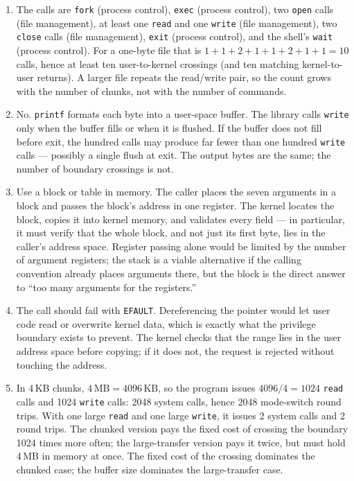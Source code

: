 \documentclass[11pt]{article}
\begin{document}
\begingroup\small
\begin{enumerate}
  \item The calls are \texttt{fork} (process control), \texttt{exec} (process
        control), two \texttt{open} calls (file management), at least one
        \texttt{read} and one \texttt{write} (file management), two
        \texttt{close} calls (file management), \texttt{exit} (process
        control), and the shell's \texttt{wait} (process control). For a
        one-byte file that is $1+1+2+1+1+2+1+1 = 10$ calls, hence at least ten
        user-to-kernel crossings (and ten matching kernel-to-user returns). A
        larger file repeats the read/write pair, so the count grows with the
        number of chunks, not with the number of commands.

  \item No. \texttt{printf} formats each byte into a user-space buffer. The
        library calls \texttt{write} only when the buffer fills or when it is
        flushed. If the buffer does not fill before exit, the hundred calls may
        produce far fewer than one hundred \texttt{write} calls --- possibly a
        single flush at exit. The output bytes are the same; the number of
        boundary crossings is not.

  \item Use a block or table in memory. The caller places the seven arguments
        in a block and passes the block's address in one register. The kernel
        locates the block, copies it into kernel memory, and validates every
        field --- in particular, it must verify that the whole block, and not
        just its first byte, lies in the caller's address space. Register
        passing alone would be limited by the number of argument registers;
        the stack is a viable alternative if the calling convention already
        places arguments there, but the block is the direct answer to ``too
        many arguments for the registers.''

  \item The call should fail with \texttt{EFAULT}. Dereferencing the pointer
        would let user code read or overwrite kernel data, which is exactly
        what the privilege boundary exists to prevent. The kernel checks that
        the range lies in the user address space before copying; if it does
        not, the request is rejected without touching the address.

  \item In 4\,KB chunks, $4\,\text{MB} = 4096\,\text{KB}$, so the program issues
        $4096/4 = 1024$ \texttt{read} calls and 1024 \texttt{write} calls:
        2048 system calls, hence 2048 mode-switch round trips. With one large
        \texttt{read} and one large \texttt{write}, it issues 2 system calls
        and 2 round trips. The chunked version pays the fixed cost of crossing
        the boundary 1024 times more often; the large-transfer version pays it
        twice, but must hold 4\,MB in memory at once. The fixed cost of the
        crossing dominates the chunked case; the buffer size dominates the
        large-transfer case.
\end{enumerate}
\endgroup
\end{document}
